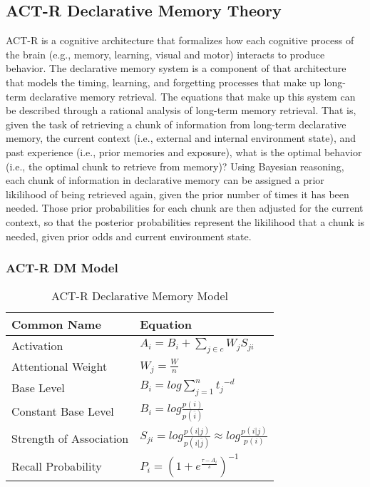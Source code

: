 \documentclass[man]{apa6}
\begin{document}
\subsection{ACT-R Declarative Memory Theory}

ACT-R \cite{Anderson2004} is a cognitive architecture that formalizes how each cognitive process of the brain (e.g., memory, learning, visual and motor) interacts to produce behavior.
The declarative memory system is a component of that architecture that models the timing, learning, and forgetting processes that make up long-term declarative memory retrieval.
The equations that make up this system can be described through a rational analysis of long-term memory retrieval.
That is, given the task of retrieving a chunk of information from long-term declarative memory,
the current context (i.e., external and internal environment state), and past experience (i.e., prior memories and exposure), 
what is the optimal behavior (i.e., the optimal chunk to retrieve from memory)?
Using Bayesian reasoning, each chunk of information in declarative memory can be assigned a prior likilihood of being retrieved again, given the prior number of times it has been needed.
Those prior probabilities for each chunk are then adjusted for the current context, so that the posterior probabilities represent the likilihood that a chunk is needed, given prior odds and current environment state.

\subsubsection{ACT-R DM Model}

\begin{table}[!ht]
  \caption{ACT-R Declarative Memory Model}
  \label{tabACT-RModel}
  {\tabulinesep=1.2mm
    \begin{tabu}{ll}
      \hline
      Common Name &  Equation \\
      \hline
      Activation &	 	$A_{i} = B_{i} + \sum_{j \in c}^{} W_{j} S_{ji}$ \\
      Attentional Weight &	$W_{j} = \frac{W}{n}$ \\
      Base Level & 		$B_{i} = log \sum_{j=1}^{n} {t_{j}}^{-d}$ \\
      Constant Base Level &	$B_{i} = log \frac{p(i)}{p(\overline{i})}$ \\
      Strength of Association &	$S_{ji} = log \frac{p(i|j)}{p(i|\overline{j})} \approx log \frac{p(i|j)}{p(i)}$ \\
      Recall Probability &	$P_{i} = \left( 1 + e^{\frac{\tau - A_{i}}{s}} \right )^{-1}$ \\
      \hline
    \end{tabu}
  }
\end{table}
\end{document}
